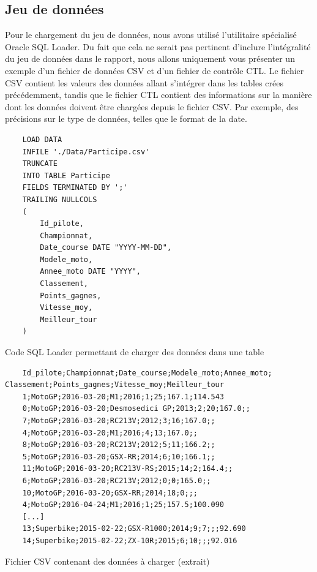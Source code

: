 \documentclass[12pt,a4paper]{article}
\newenvironment{code}{\captionsetup{type=listing}}{}
\begin{document}
\subsection{Jeu de données}
\label{sub.data}

Pour le chargement du jeu de données, nous avons utilisé l'utilitaire spécialisé
Oracle SQL Loader. Du fait que cela ne serait pas pertinent d’inclure
l’intégralité du jeu de données dans le rapport, nous allons uniquement vous
présenter un exemple d’un fichier de données CSV et d’un fichier de contrôle
CTL. Le fichier CSV contient les valeurs des données allant s’intégrer dans les
tables crées précédemment, tandis que le fichier CTL contient des informations
sur la manière dont les données doivent être chargées depuis le fichier CSV. Par
exemple, des précisions sur le type de données, telles que le format de la date.

\begin{code}
    \begin{verbatim}
    LOAD DATA
    INFILE './Data/Participe.csv'
    TRUNCATE
    INTO TABLE Participe
    FIELDS TERMINATED BY ';'
    TRAILING NULLCOLS
    (
        Id_pilote,
        Championnat,
        Date_course DATE "YYYY-MM-DD",
        Modele_moto,
        Annee_moto DATE "YYYY",
        Classement,
        Points_gagnes,
        Vitesse_moy,
        Meilleur_tour
    )
    \end{verbatim}
    \caption{Code SQL Loader permettant de charger des données dans une table}
    \label{lst.loadctl}
\end{code}

\begin{code}
    \begin{verbatim}
    Id_pilote;Championnat;Date_course;Modele_moto;Annee_moto; Classement;Points_gagnes;Vitesse_moy;Meilleur_tour
    1;MotoGP;2016-03-20;M1;2016;1;25;167.1;114.543
    0;MotoGP;2016-03-20;Desmosedici GP;2013;2;20;167.0;;
    7;MotoGP;2016-03-20;RC213V;2012;3;16;167.0;;
    4;MotoGP;2016-03-20;M1;2016;4;13;167.0;;
    8;MotoGP;2016-03-20;RC213V;2012;5;11;166.2;;
    5;MotoGP;2016-03-20;GSX-RR;2014;6;10;166.1;;
    11;MotoGP;2016-03-20;RC213V-RS;2015;14;2;164.4;;
    6;MotoGP;2016-03-20;RC213V;2012;0;0;165.0;;
    10;MotoGP;2016-03-20;GSX-RR;2014;18;0;;;
    4;MotoGP;2016-04-24;M1;2016;1;25;157.5;100.090
    [...]
    13;Superbike;2015-02-22;GSX-R1000;2014;9;7;;;92.690
    14;Superbike;2015-02-22;ZX-10R;2015;6;10;;;92.016
    \end{verbatim}
    \caption{Fichier CSV contenant des données à charger (extrait)}
    \label{lst.loadcsv}
\end{code}
\end{document}
